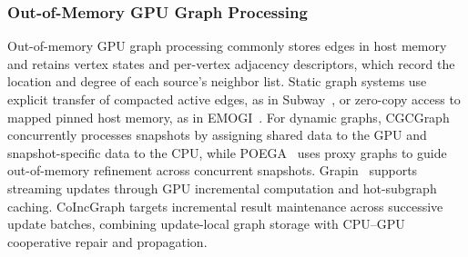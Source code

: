 
\subsubsection{Out-of-Memory GPU Graph Processing}
Out-of-memory GPU graph processing commonly stores edges in
host memory and retains vertex states and per-vertex adjacency descriptors, which record the location and degree of each source's neighbor list. Static graph systems use explicit transfer of
compacted active edges, as in Subway~\cite{2020-Subway}, or
zero-copy access to mapped pinned host memory, as in
EMOGI~\cite{2020-EMOGI}. For dynamic graphs,
CGCGraph~\cite{2025-CGCGraph} concurrently processes snapshots
by assigning shared data to the GPU and snapshot-specific
data to the CPU, while POEGA~\cite{2026-POEGA} uses proxy
graphs to guide out-of-memory refinement across concurrent
snapshots. Grapin~\cite{2025-Grapin} supports streaming updates
through GPU incremental computation and hot-subgraph caching.
CoIncGraph targets incremental result maintenance across
successive update batches, combining update-local graph
storage with CPU--GPU cooperative repair and propagation.



